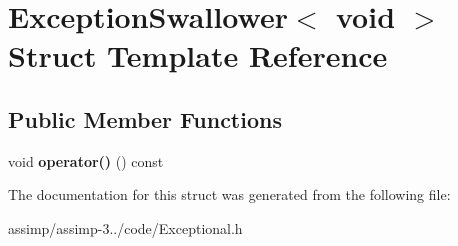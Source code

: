 \hypertarget{struct_exception_swallower_3_01void_01_4}{\section{Exception\+Swallower$<$ void $>$ Struct Template Reference}
\label{struct_exception_swallower_3_01void_01_4}
}
\subsection*{Public Member Functions}
\begin{DoxyCompactItemize}
\item 
\hypertarget{struct_exception_swallower_3_01void_01_4_a301c992e573ce841b230a92e73bfbd51}{void {\bfseries operator()} () const }\label{struct_exception_swallower_3_01void_01_4_a301c992e573ce841b230a92e73bfbd51}

\end{DoxyCompactItemize}


The documentation for this struct was generated from the following file\+:\begin{DoxyCompactItemize}
\item 
assimp/assimp-\/3../code/Exceptional.\+h\end{DoxyCompactItemize}
